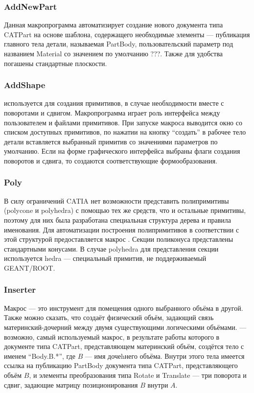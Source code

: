 \subsubsection{AddNewPart}\label{sec:AddNewPart}

Данная макропрограмма автоматизирует создание нового документа типа CATPart на основе шаблона, содержащего необходимые элементы --- публикация главного тела детали, называемая PartBody, пользовательский параметр под названием Material со значением по умолчанию ???. Также для удобства погашены стандартные плоскости.

\subsubsection{AddShape}\label{sec:AddShape}

 используется для создания примитивов, в случае необходимости вместе с поворотами и сдвигом. Макропрограмма играет роль интерфейса между пользователем и файлами примитивов. При запуске макроса выводится окно со списком доступных примитивов, по нажатии на кнопку ``создать'' в рабочее тело детали вставляется выбранный примитив со значениями параметров по умолчанию. Если на форме графического интерфейса выбраны флаги создания поворотов и сдвига, то создаются соответствующие формообразования.

\subsubsection{Poly}\label{sec:Poly}

В силу ограничений CATIA нет возможности представить полипримитивы (polycone и polyhedra) с помощью тех же средств, что и остальные примитивы, поэтому для них была разработана специальная структура дерева и правила именования. Для автоматизации построения полипримитивов в соответствии с этой структурой предоставляется макрос . Секции поликонуса представлены стандартными конусами. В случае polyhedra для представления секции используется hedra --- специальный примитив, не поддерживаемый GEANT/ROOT.

\subsubsection{Inserter}\label{sec:Inserter}

Макрос  --- это инструмент для помещения одного выбранного объёма в другой. Также можно сказать, что  создаёт физический объём, задающий связь материнский-дочерний между двумя существующими логическими объёмами.  --- возможно, самый используемый макрос, в результате работы которого в документе типа CATPart, представляющем материнский объём, создётся тело с именем ``Body.B.*'', где $B$ --- имя дочеhнего объёма. Внутри этого тела имеется ссылка на публикацию PartBody документа типа CATPart, представляющего объём $B$, и элементы преобразования типа Rotate и Translate --- три поворота и сдвиг, задающие матрицу позиционирования $B$ внутри $A$.

